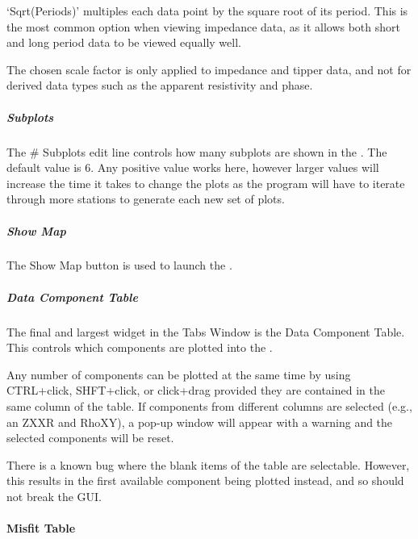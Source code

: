 \documentclass[letterpaper,10pt,english]{sphinxmanual}
\begin{document}
‘Sqrt(Periods)’ multiples each data point by the square root of its period. This is the most common option when viewing impedance data, as it allows both short and long period data to be viewed equally well.

The chosen scale factor is only applied to impedance and tipper data, and not for derived data types such as the apparent resistivity and phase.


\subparagraph{Subplots}
\label{\detokenize{content/data_plot/main_window:subplots}}\label{\detokenize{content/data_plot/main_window:id5}}
The \# Subplots edit line controls how many subplots are shown in the {\hyperref[\detokenize{content/data_plot/main_window:plot-window}]{}}. The default value is 6. Any positive value works here, however larger values will increase the time it takes to change the plots as the program will have to iterate through more stations to generate each new set of plots.


\subparagraph{Show Map}
\label{\detokenize{content/data_plot/main_window:show-map}}\label{\detokenize{content/data_plot/main_window:id6}}
The Show Map button is used to launch the {\hyperref[\detokenize{content/data_plot/map_viewer:map-viewer}]{}}.


\subparagraph{Data Component Table}
\label{\detokenize{content/data_plot/main_window:data-component-table}}\label{\detokenize{content/data_plot/main_window:id7}}
The final and largest widget in the Tabs Window is the Data Component Table. This controls which components are plotted into the {\hyperref[\detokenize{content/data_plot/main_window:plot-window}]{}}.

Any number of components can be plotted at the same time by using CTRL+click, SHFT+click, or click+drag provided they are contained in the same column of the table. If components from different columns are selected (e.g., an ZXXR and RhoXY), a pop-up window will appear with a warning and the selected components will be reset.

There is a known bug where the blank items of the table are selectable. However, this results in the first available component being plotted instead, and so should not break the GUI.


\paragraph{Misfit Table}
\label{\detokenize{content/data_plot/main_window:misfit-table}}\label{\detokenize{content/data_plot/main_window:id8}}
\begin{figure}[htbp]
\centering

\noindent{}
\end{figure}
\end{document}
